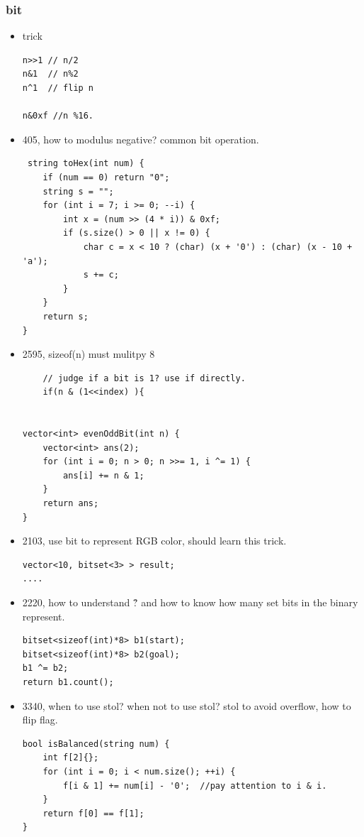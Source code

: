 \documentclass[a4paper,11pt,twoside]{book}
\begin{document}
\subsubsection{bit}

\begin{itemize}
	\item trick
\begin{lstlisting}
n>>1 // n/2
n&1  // n%2
n^1  // flip n

n&0xf //n %16.
\end{lstlisting}
	
	\item 405, how to modulus negative? common bit operation. 
	
\begin{lstlisting}
 string toHex(int num) {
	if (num == 0) return "0";
	string s = "";
	for (int i = 7; i >= 0; --i) {
		int x = (num >> (4 * i)) & 0xf;
		if (s.size() > 0 || x != 0) {
			char c = x < 10 ? (char) (x + '0') : (char) (x - 10 + 'a');
			s += c;
		}
	}
	return s;
}
\end{lstlisting}
	
	\item 2595, sizeof(n) must mulitpy 8
\begin{lstlisting}
	// judge if a bit is 1? use if directly. 
	if(n & (1<<index) ){
		
		
vector<int> evenOddBit(int n) {
	vector<int> ans(2);
	for (int i = 0; n > 0; n >>= 1, i ^= 1) {
		ans[i] += n & 1;
	}
	return ans;
}		
\end{lstlisting}
		
	
	\item 2103, use bit to represent RGB color, should learn this trick. 
\begin{lstlisting}
vector<10, bitset<3> > result;
....
\end{lstlisting}	

	
	\item 2220, how to understand \^? and how to know how many set bits in the binary represent. 
\begin{lstlisting}
bitset<sizeof(int)*8> b1(start);
bitset<sizeof(int)*8> b2(goal);
b1 ^= b2;
return b1.count();
\end{lstlisting}
	
	\item 3340, when to use stol? when not to use stol? stol to avoid overflow, how to flip flag. 
\begin{lstlisting}
bool isBalanced(string num) {
	int f[2]{};
	for (int i = 0; i < num.size(); ++i) {
		f[i & 1] += num[i] - '0';  //pay attention to i & i. 
	}
	return f[0] == f[1];
}
\end{lstlisting}	


\end{itemize}
\end{document}
